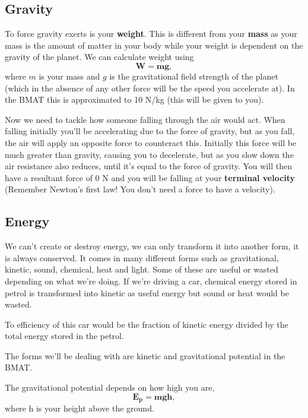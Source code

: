 \documentclass[11pt, titlepage]{article}
\begin{document}
\subsection{Gravity}

To force gravity exerts is your \textbf{weight}.  This is different from your \textbf{mass} as your mass is the amount of matter in your body while your weight is dependent on the gravity of the planet.  We can calculate weight using
\begin{equation*}
\mathbf{W=mg},
\end{equation*}
where $m$ is your mass and $g$ is the gravitational field strength of the planet (which in the absence of any other force will be the speed you accelerate at).  In the BMAT this is approximated to 10 N/kg (this will be given to you).

Now we need to tackle how someone falling through the air would act.  When falling initially you'll be accelerating due to the force of gravity, but as you fall, the air will apply an opposite force to counteract this.  Initially this force will be much greater than gravity, causing you to decelerate, but as you slow down the air resistance also reduces, until it's equal to the force of gravity.  You will then have a resultant force of 0 N and you will be falling at your \textbf{terminal velocity} (Remember Newton's first law!  You don't need a force to have a velocity).

\subsection{Energy}
We can't create or destroy energy, we can only transform it into another form, it is always conserved.  It comes in many different forms such as gravitational, kinetic, sound, chemical, heat and light.  Some of these are useful or wasted depending on what we're doing.  If we're driving a car, chemical energy stored in petrol is transformed into kinetic as useful energy but sound or heat would be wasted.

To efficiency of this car would be the fraction of kinetic energy divided by the total energy stored in the petrol.  

The forms we'll be dealing with are kinetic and gravitational potential in the BMAT.

The gravitational potential depends on how high you are,
\begin{equation*}
\mathbf{E_p=mgh},
\end{equation*}
where h is your height above the ground.
\end{document}
